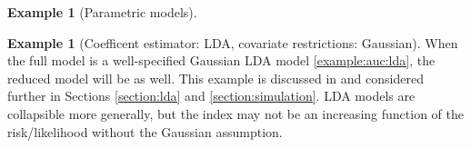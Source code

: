\documentclass[12pt]{article}
\theoremstyle{definition}
\newtheorem{example}{Example}%
\newtheorem{subexample}{Example}%
\newcommand{\comment}[1]{
  \iftoggle{commenttoggle}{
    {\normalsize{\color{red}{ #1}}\normalsize}
  }
  {}
}
\begin{document}
\begin{example}[Parametric models]
\begin{subexample} [Coefficent estimator: LDA, covariate restrictions:
  Gaussian] When the full model is a well-specified Gaussian LDA model
  \ref{example:auc:lda}, the reduced model will be as well. This
  example is discussed in \citet{demler2011} \comment{give their
    mahalanobis distance characterization. cite other papers that discuss this model} and considered further in Sections \ref{section:lda} and \ref{section:simulation}. LDA models are collapsible
  more generally, but the index may not be an increasing function of
  the risk/likelihood without the Gaussian assumption.  %
\end{subexample}
\end{example}


\end{document}
